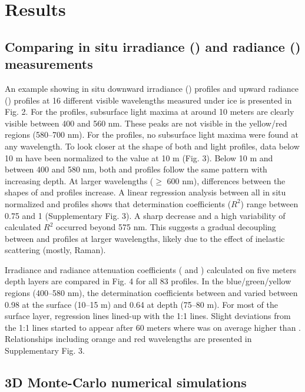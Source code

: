 \section{Results}

\subsection{Comparing in situ irradiance (\ed{}) and radiance (\lu{}) measurements}

An example showing in situ downward irradiance (\ed{}) profiles and upward radiance (\lu{}) profiles at 16 different visible wavelengths measured under ice is presented in Fig. 2. For the \ed{} profiles, subsurface light maxima at around 10 meters are clearly visible between 400 and 560 nm. These peaks are not visible in the yellow/red regions (580--700 nm). For the \lu{} profiles, no subsurface light maxima were found at any wavelength. To look closer at the shape of both \ed{} and \lu{} light profiles, data below 10 m have been normalized to the value at 10 m (Fig. 3). Below 10 m and between 400 and 580 nm, both \ed{} and \lu{} profiles follow the same pattern with increasing depth. At larger wavelengths ($\ge$ 600 nm), differences between the shapes of \ed{} and \lu{} profiles increase. A linear regression analysis between all in situ normalized \ed{} and \lu{} profiles shows that determination coefficients ($R^2$) range between 0.75 and 1 (Supplementary Fig. 3). A sharp decrease and a high variability of calculated $R^2$ occurred beyond 575 nm. This suggests a gradual decoupling between \ed{} and \lu{} profiles at larger wavelengths, likely due to the effect of inelastic scattering (mostly, Raman).

Irradiance and radiance attenuation coefficients (\ked{} and \klu) calculated on five meters depth layers are compared in Fig. 4 for all 83 profiles. In the blue/green/yellow regions (400--580 nm), the determination coefficients between \ked{} and \klu varied between 0.98 at the surface (10--15 m) and 0.64 at depth (75--80 m). For most of the surface layer, regression lines lined-up with the 1:1 lines. Slight deviations from the 1:1 lines started to appear after 60 meters where \ked{} was on average higher than \klu{}. Relationships including orange and red wavelengths are presented in Supplementary Fig. 3.

\subsection{3D Monte-Carlo numerical simulations}

